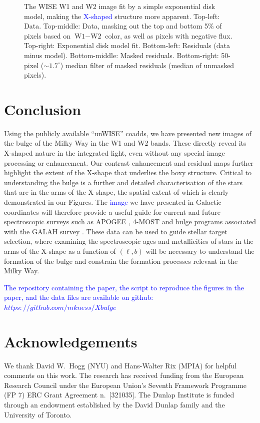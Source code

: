 \documentclass[12pt, preprint]{aastex}
\begin{document}
\begin{figure}[h!]
\caption{%
  The WISE W1 and W2 image fit by a simple exponential disk
  model, making the \textcolor{blue}{X-shaped} structure more apparent.
  Top-left: Data.  Top-middle: Data, masking out the top and bottom 5\%
  of pixels based on $\textrm{W1} - \textrm{W2}$ color, as well as pixels with negative flux.
  Top-right: Exponential disk model fit.
  Bottom-left: Residuals (data minus model).  Bottom-middle: Masked residuals.
  Bottom-right: 50-pixel ($\sim 1.7^{\circ}$) median filter of masked residuals (median of unmasked
  pixels).
  }
\label{fig:modfit}
\end{figure}




\section{Conclusion}

Using the publicly available ``unWISE'' coadds, we have presented new images of the bulge of the Milky Way in the W1 and W2 bands.  These directly reveal its X-shaped nature in the integrated light, even without any special image processing or enhancement. Our contrast enhancement and residual maps further highlight the extent of the X-shape that underlies the boxy structure. Critical to understanding the bulge is a further and detailed characterisation of the stars that are in the arms of the X-shape, the spatial extent of which is clearly demonstrated in our Figures. The \textcolor{blue}{image} we have presented in Galactic coordinates will therefore provide a useful guide for current and future spectroscopic surveys such as APOGEE \citep{Majewski2015}, 4-MOST \citep{4most} and bulge programs associated with the GALAH survey \citep{deSilva2015}. These data can be used to guide stellar target selection, where examining the spectroscopic ages \citep[e.g.][]{Martig2016, Ness2016} and metallicities of stars in the arms of the X-shape as a function of $(\ell,b)$ will be necessary to understand the formation of the bulge and constrain the formation processes relevant in the Milky Way. 

\textcolor{blue}{The repository containing the paper, the script to reproduce the figures in the paper, and the data files are available on github: $https://github.com/mkness/Xbulge$}


\section{Acknowledgements} 
We thank David W.~Hogg (NYU) and Hans-Walter Rix (MPIA) for helpful
comments on this work.  The research has received funding from the
European Research Council under the European Union's Seventh Framework
Programme (FP 7) ERC Grant Agreement n.~[321035].
%
The Dunlap Institute is funded through an endowment established by the David Dunlap family and the University of Toronto.
\end{document}
